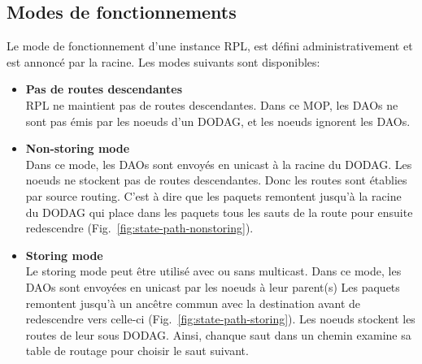 \subsection*{Modes de fonctionnements}\label{subsec:state-mop}
    Le mode de fonctionnement d'une instance RPL, est défini administrativement et est annoncé par la racine. Les modes suivants sont disponibles:
    \begin{itemize}
        \item \textbf{Pas de routes descendantes}\\
            RPL ne maintient pas de routes descendantes. Dans ce MOP, les DAOs ne sont pas émis par les noeuds d'un DODAG, et les noeuds ignorent les DAOs.
        \item \textbf{Non-storing mode}\\
            Dans ce mode, les DAOs sont envoyés en unicast à la racine du DODAG.
            Les noeuds ne stockent pas de routes descendantes. Donc les routes sont établies par source routing. C'est à dire que les paquets remontent jusqu'à la racine du DODAG qui place dans les paquets tous les sauts de la route pour ensuite redescendre (Fig.~\ref{fig:state-path-nonstoring}).
        \item \textbf{Storing mode}\\
            Le storing mode peut être utilisé avec ou sans multicast.
            Dans ce mode, les DAOs sont envoyées en unicast par les noeuds à leur parent(s)
            Les paquets remontent jusqu'à un ancêtre commun avec la destination avant de redescendre vers celle-ci (Fig.~\ref{fig:state-path-storing}).
            Les noeuds stockent les routes de leur sous DODAG. Ainsi, chanque saut dans un chemin examine sa table de routage pour choisir le saut suivant.
    \end{itemize}
    
